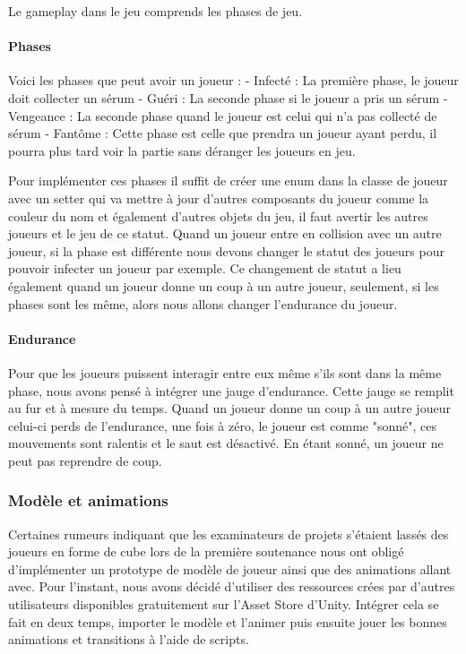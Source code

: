 \documentclass{article}
\begin{document}
Le gameplay dans le jeu comprends les phases de jeu.

\paragraph{Phases}

Voici les phases que peut avoir un joueur :
- Infecté : La première phase, le joueur doit collecter un sérum
- Guéri : La seconde phase si le joueur a pris un sérum
- Vengeance : La seconde phase quand le joueur est celui qui n'a pas collecté de sérum
- Fantôme : Cette phase est celle que prendra un joueur ayant perdu, il pourra plus tard voir la partie sans déranger les joueurs en jeu.

Pour implémenter ces phases il suffit de créer une enum dans la classe de joueur avec un setter qui va mettre à jour d'autres composants du joueur comme la couleur du nom et également d'autres objets du jeu, il faut avertir les autres joueurs et le jeu de ce statut. Quand un joueur entre en collision avec un autre joueur, si la phase est différente nous devons changer le statut des joueurs pour pouvoir infecter un joueur par exemple. Ce changement de statut a lieu également quand un joueur donne un coup à un autre joueur, seulement, si les phases sont les même, alors nous allons changer l'endurance du joueur.

\paragraph{Endurance}

Pour que les joueurs puissent interagir entre eux même s'ils sont dans la même phase, nous avons pensé à intégrer une jauge d'endurance. Cette jauge se remplit au fur et à mesure du temps. Quand un joueur donne un coup à un autre joueur celui-ci perds de l'endurance, une fois à zéro, le joueur est comme "sonné", ces mouvements sont ralentis et le saut est désactivé. En étant sonné, un joueur ne peut pas reprendre de coup.


\subsubsection{Modèle et animations}

Certaines rumeurs indiquant que les examinateurs de projets s'étaient lassés des joueurs en forme de cube lors de la première soutenance nous ont obligé d'implémenter un prototype de modèle de joueur ainsi que des animations allant avec. Pour l'instant, nous avons décidé d'utiliser des ressources crées par d'autres utilisateurs disponibles gratuitement sur l'Asset Store d'Unity. Intégrer cela se fait en deux temps, importer le modèle et l'animer puis ensuite jouer les bonnes animations et transitions à l'aide de scripts.
\end{document}
